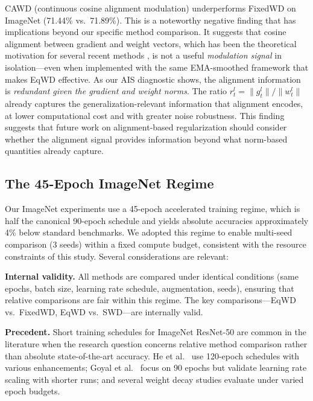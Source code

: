 \documentclass{article}
\begin{document}
CAWD (continuous cosine alignment modulation) underperforms FixedWD on
ImageNet (71.44\% vs.~71.89\%). This is a noteworthy negative finding
that has implications beyond our specific method comparison. It suggests
that cosine alignment between gradient and weight vectors, which has
been the theoretical motivation for several recent methods
\citep{chen2026cwd, sun2025cvpr}, is not a useful \emph{modulation
signal} in isolation---even when implemented with the same EMA-smoothed
framework that makes EqWD effective. As our AIS diagnostic shows, the
alignment information is \emph{redundant given the gradient and weight
norms}. The ratio $r_t^l = \|g_t^l\| / \|w_t^l\|$ already captures the
generalization-relevant information that alignment encodes, at lower
computational cost and with greater noise robustness. This finding
suggests that future work on alignment-based regularization should
consider whether the alignment signal provides information beyond what
norm-based quantities already capture.

\subsection{The 45-Epoch ImageNet Regime}
\label{sec:45epoch}

Our ImageNet experiments use a 45-epoch accelerated training regime,
which is half the canonical 90-epoch schedule \citep{he2016resnet} and
yields absolute accuracies approximately 4\% below standard benchmarks.
We adopted this regime to enable multi-seed comparison (3 seeds) within
a fixed compute budget, consistent with the resource constraints of this
study. Several considerations are relevant:

\textbf{Internal validity.} All methods are compared under identical
conditions (same epochs, batch size, learning rate schedule,
augmentation, seeds), ensuring that relative comparisons are fair within
this regime. The key comparisons---EqWD vs.~FixedWD, EqWD vs.~SWD---are
internally valid.

\textbf{Precedent.} Short training schedules for ImageNet ResNet-50 are
common in the literature when the research question concerns relative
method comparison rather than absolute state-of-the-art accuracy. He et
al.~\citep{he2019bag} use 120-epoch schedules with various enhancements;
Goyal et al.~\citep{goyal2017accurate} focus on 90 epochs but validate
learning rate scaling with shorter runs; and several weight decay
studies \citep{xie2023swd, franke2024cpr} evaluate under varied epoch
budgets.
\end{document}
